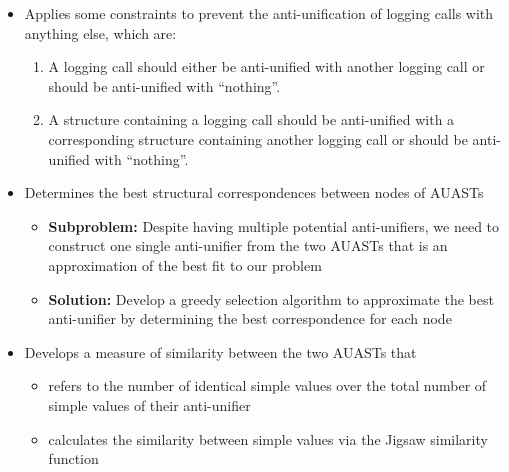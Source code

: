 \documentclass{article}
\newcommand{\bold}{\textbf}
\newcommand{\nothing}{{``nothing''}}
\begin{document}
\begin{itemize} [leftmargin=.1in]
\begin{itemize} [leftmargin=.1in]
\item Applies some constraints to prevent the anti-unification of logging calls with anything else, which are:
\begin{enumerate} [leftmargin=.2in]
\item A logging call should either be anti-unified with another logging call or should be anti-unified with \nothing.
\item A structure containing a logging call should be anti-unified with a corresponding structure containing another logging call or should be anti-unified with \nothing.
\end{enumerate}
\item Determines the best structural correspondences between nodes of AUASTs
\begin{itemize}
\item \bold{Subproblem: }Despite having multiple potential anti-unifiers, we need to construct one single anti-unifier from the two AUASTs that is an approximation of the best fit to our problem
\item \bold{Solution: }Develop a greedy selection algorithm to approximate the best anti-unifier by determining the best correspondence for each node
\end{itemize}
\item Develops a measure of similarity between the two AUASTs that
\begin{itemize}
\item refers to the number of identical simple values over the total number of simple values of their anti-unifier
\item calculates the similarity between simple values via the Jigsaw similarity function
\end{itemize}
\end{itemize}


\end{itemize}
\end{document}
